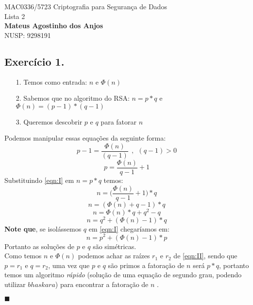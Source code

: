 \documentclass[12pt]{article}
\newcommand{\newqed}{{\hfill\color{black}\ensuremath{\blacksquare}}}
\begin{document}
\begin{center}
{\Large MAC0336/5723 Criptografia para Segurança de Dados\\
Lista 2}\\
\textbf{Mateus Agostinho dos Anjos}\\
NUSP: 9298191
\end{center}

\vspace{0.4 cm}

\subsection*{Exercício 1.}
	\begin{itemize}
		\item[1. ]
			Temos como entrada:	 $n$ e $\Phi(n)$
		\item[2. ]	
			Sabemos que no algoritmo do RSA: $n = p * q$ e $\Phi(n) = (p-1)*(q-1)$
		\item[3. ]	
			Queremos descobrir $p$ e $q$	para fatorar $n$
	\end{itemize}
	Podemos manipular essas equações da seguinte forma:
	$$p - 1 = \frac{\Phi(n)}{(q - 1)}  \ \ , \ \  (q - 1) > 0$$
	\begin{equation}
		\label{eqn:I} \tag{I}
			p = \frac{\Phi(n)}{q - 1} + 1 
	\end{equation}
	Substituindo \eqref{eqn:I} em $n = p * q$ temos:
	$$ n = \Big(\frac{\Phi(n)}{q - 1} + 1\Big) * q $$
	$$ n = (\Phi(n) + q - 1) * q$$
	$$ n = \Phi(n)*q + q^2 - q$$
	\begin{equation}
		\label{eqn:II} \tag{II}
			 n = q^2 + (\Phi(n) - 1) * q
	\end{equation}
	\textbf{Note que}, se isolássemos $q$ em \eqref{eqn:I} chegaríamos em:
	$$n = p^2 + (\Phi(n) - 1) * p$$
	Portanto as soluções de $p$ e $q$ são simétricas.\\
	
	Como temos $n$ e $\Phi(n)$ podemos achar as raízes $r_1$ e $r_2$ de
	\eqref{eqn:II}, sendo que $p = r_1$ e $q = r_2$, uma vez que
	$p$ e $q$ são primos a fatoração de $n$ será $p * q$, portanto temos
	um algoritmo \textit{rápido} (solução de uma equação de segundo grau, podendo
	utilizar $bhaskara$) para encontrar a fatoração de $n$ .
	
	\newqed

\newpage	
\end{document}
